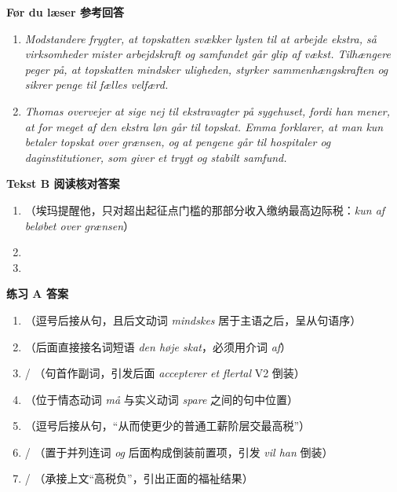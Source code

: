 \begin{answerbox}
\textbf{Før du læser 参考回答}
\begin{enumerate}
  \item \textit{Modstandere frygter, at topskatten svækker lysten til at arbejde ekstra, så virksomheder mister arbejdskraft og samfundet går glip af vækst. Tilhængere peger på, at topskatten mindsker uligheden, styrker sammenhængskraften og sikrer penge til fælles velfærd.}
  \item \textit{Thomas overvejer at sige nej til ekstravagter på sygehuset, fordi han mener, at for meget af den ekstra løn går til topskat. Emma forklarer, at man kun betaler topskat over grænsen, og at pengene går til hospitaler og daginstitutioner, som giver et trygt og stabilt samfund.}
\end{enumerate}

\textbf{Tekst B 阅读核对答案}
\begin{enumerate}
  \item {}（埃玛提醒他，只对超出起征点门槛的那部分收入缴纳最高边际税：\textit{kun af beløbet over grænsen}）
  \item {}
  \item {}
\end{enumerate}

\textbf{练习 A 答案}
\begin{enumerate}
  \item {}（逗号后接从句，且后文动词 \textit{mindskes} 居于主语之后，呈从句语序）
  \item {}（后面直接接名词短语 \textit{den høje skat}，必须用介词 \textit{af}）
  \item {} / （句首作副词，引发后面 \textit{accepterer et flertal} V2 倒装）
  \item {}（位于情态动词 \textit{må} 与实义动词 \textit{spare} 之间的句中位置）
  \item {}（逗号后接从句，“从而使更少的普通工薪阶层交最高税”）
  \item {} / （置于并列连词 \textit{og} 后面构成倒装前置项，引发 \textit{vil han} 倒装）
  \item {} / （承接上文“高税负”，引出正面的福祉结果）
\end{enumerate}


\end{answerbox}
